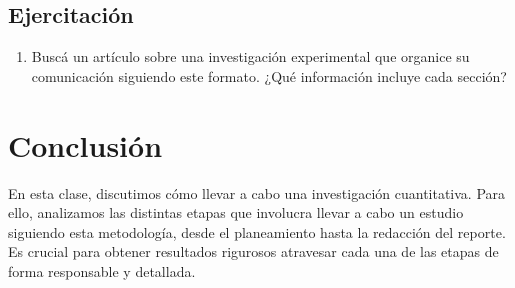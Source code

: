 \documentclass[12pt,spanish,a4paper,]{article}
\providecommand{\tightlist}{%
  \setlength{\itemsep}{0pt}\setlength{\parskip}{0pt}}
\begin{document}
\hypertarget{ejercitacion-8}{%
\subsection{Ejercitación}\label{ejercitacion-8}}

\begin{enumerate}
\def\labelenumi{\arabic{enumi}.}
\tightlist
\item
  Buscá un artículo sobre una investigación experimental que organice su
  comunicación siguiendo este formato. ¿Qué información incluye cada
  sección?
\end{enumerate}

\hypertarget{conclusion}{%
\section{Conclusión}\label{conclusion}}

En esta clase, discutimos cómo llevar a cabo una investigación
cuantitativa. Para ello, analizamos las distintas etapas que involucra
llevar a cabo un estudio siguiendo esta metodología, desde el
planeamiento hasta la redacción del reporte. Es crucial para obtener
resultados rigurosos atravesar cada una de las etapas de forma
responsable y detallada.
\end{document}
